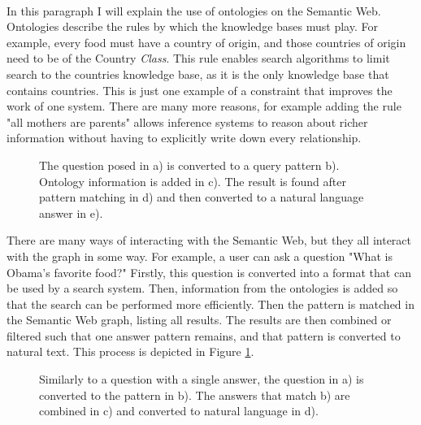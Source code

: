 \documentclass{article}
\begin{document}
 \paragraph{}
 In this paragraph I will explain the use of ontologies on the Semantic Web. Ontologies describe the rules by which the knowledge bases must play. For example, every food must have a country of origin, and those countries of origin need to be of the Country \emph{Class}. This rule enables search algorithms to limit search to the countries knowledge base, as it is the only knowledge base that contains countries\cite{whyontologies}. This is just one example of a constraint that improves the work of one system. There are many more reasons, for example adding the rule "all mothers are parents" allows inference systems to reason about richer information without having to explicitly write down every relationship.
 
 \begin{figure}[H]
 \centering
 \caption[Graph question example]{The question posed in a) is converted to a query pattern b). Ontology information is added in c). The result is found after pattern matching in d) and then converted to a natural language answer in e).}
 \label{question_graph}
 \end{figure}
 
 There are many ways of interacting with the Semantic Web, but they all interact with the graph in some way. For example, a user can ask a question "What is Obama's favorite food?" Firstly, this question is converted into a format that can be used by a search system. Then, information from the ontologies is added so that the search can be performed more efficiently. Then the pattern is matched in the Semantic Web graph, listing all results. The results are then combined or filtered such that one answer pattern remains, and that pattern is converted to natural text. This process is depicted in Figure \ref{question_graph}.

 \begin{figure}[H]
 \centering
 \caption[Graph biography example]{Similarly to a question with a single answer, the question in a) is converted to the pattern in b). The answers that match b) are combined in c) and converted to natural language in d).}
 \label{question_graph2}
 \end{figure}
 
\end{document}
